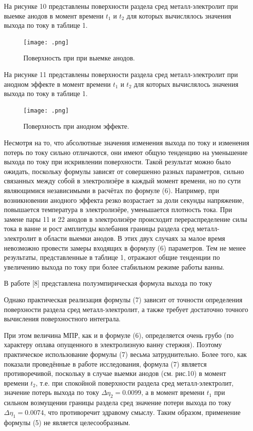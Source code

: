 \documentclass{article}
\begin{document}
На рисунке 10 представлены поверхности раздела сред металл-электролит при выемке анодов в момент времени $t_1$ и $t_2$ для которых вычислялось значения выхода по току в таблице 1.

\begin{figure}[h!]
    \centering
    \texttt{[image: .png]}
    \caption{Поверхность при при выемке анодов.}
    \label{fig:} 
\end{figure}

На рисунке 11 представлены поверхности раздела сред металл-электролит при анодном эффекте в момент времени $t_1$ и $t_2$ для которых вычислялось значения выхода по току в таблице 1.

\begin{figure}[h!]
    \centering
    \texttt{[image: .png]}
    \caption{Поверхность при анодном эффекте.}
    \label{fig:} 
\end{figure}

Несмотря на то, что абсолютные значения изменения выхода по току и изменения потерь по току сильно отличаются, они имеют общую тенденцию на уменьшение выхода по току при искривлении поверхности. Такой результат можно было ожидать, поскольку формулы зависят от совершенно разных параметров, сильно связанных между собой в электролизёре в каждый момент времени, но по сути являющимися независимыми в расчётах по формуле (6). Например, при возникновении анодного эффекта резко возрастает за доли секунды напряжение, повышается температура в электролизёре, уменьшается плотность тока. При замене пары 11 и 22 анодов в электролизёре происходит перераспределение силы тока в ванне и рост амплитуды колебания границы раздела сред металл-электролит в области выемки анодов. В этих двух случаях за малое время невозможно провести замеры входящих в формулу (6) параметров. Тем не менее результаты, представленные в таблице 1, отражают общие тенденции по увеличению выхода по току при более стабильном режиме работы ванны.

В работе [8] представлена полуэмпирическая формула выхода по току

%

Однако практическая реализация формулы (7) зависит от точности определения поверхности раздела сред металл-электролит, а также требует достаточно точного вычисления поверхностного интеграла. 

При этом величина МПР, как и в формуле (6), определяется очень грубо (по характеру оплава опущенного в электролизную ванну стержня). Поэтому практическое использование формулы (7) весьма затруднительно. Более того, как показали проведённые в работе исследования, формула (7) является противоречивой, поскольку в случае выемки анодов (см. рис.10) в момент времени $t_2$, т.е. при спокойной поверхности раздела сред металл-электролит, значение  потерь выхода по току $\Delta\eta_2 = 0.0099$, а в момент времени $t_1$ при сильном возмущении границы раздела сред значение потери выхода по току $\Delta\eta_1 = 0.0074$, что противоречит здравому смыслу.  Таким образом, применение формулы (5) не является целесообразным.
\end{document}
